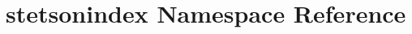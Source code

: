 \hypertarget{namespacestetsonindex}{\section{stetsonindex Namespace Reference}
\label{namespacestetsonindex}
}

